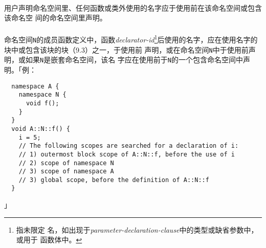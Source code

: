 \paragraph{}
用户声明命名空间里、任何函数或类外使用的名字应于使用前在该命名空间或包含该命名空
间的命名空间里声明。

\paragraph{}
命名空间\texttt{N}的成员函数定义中，函数\textit{declarator-id}\footnote{指未限定
名，如出现于\textit{parameter-declaration-clause}中的类型或缺省参数中，或用于
函数体中。}后使用的名字，应在使用名字的块中或包含该块的块（9.3）之一，于使用前
声明，或在命名空间\texttt{N}中于使用前声明，或如果\texttt{N}是嵌套命名空间，该名
字应在使用前于\texttt{N}的一个包含命名空间中声明。「例：
\begin{lstlisting}
  namespace A {
    namespace N {
      void f();
    }
  }
  void A::N::f() {
    i = 5;
    // The following scopes are searched for a declaration of i:
    // 1) outermost block scope of A::N::f, before the use of i
    // 2) scope of namespace N
    // 3) scope of namespace A
    // 3) global scope, before the definition of A::N::f
  }
\end{lstlisting}」

